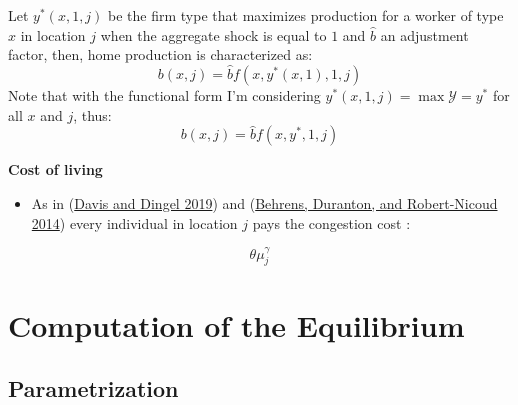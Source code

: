 \documentclass[
  letterpaper,
  DIV=11,
  numbers=noendperiod]{scrreprt}
\providecommand{\tightlist}{%
  \setlength{\itemsep}{0pt}\setlength{\parskip}{0pt}}\usepackage{longtable,booktabs,array}
\begin{document}
Let \(y^*(x,1, j)\) be the firm type that maximizes production for a
worker of type \(x\) in location \(j\) when the aggregate shock is equal
to \(1\) and \(\hat{b}\) an adjustment factor, then, home production is
characterized as:\\
\[
b(x, j) = \hat{b} f(x,y^*(x,1),1, j)\] Note that with the functional
form I'm considering \(y^{*}(x,1,j) = \max{\mathcal{Y}}=y^{*}\) for all
\(x\) and \(j\), thus: \[b(x, j) = \hat{b} f(x,y^*,1, j)\]

\textbf{Cost of living}

\begin{itemize}
\tightlist
\item
  As in (\protect\hyperlink{ref-davisSpatialKnowledgeEconomy2019}{Davis
  and Dingel 2019}) and
  (\protect\hyperlink{ref-behrensProductiveCitiesSorting2014a}{Behrens,
  Duranton, and Robert-Nicoud 2014}) every individual in location \(j\)
  pays the congestion cost :
\end{itemize}

\[\theta\mu_j^{\gamma}\]


\hypertarget{computation-of-the-equilibrium}{%
\chapter{Computation of the
Equilibrium}\label{computation-of-the-equilibrium}}

\hypertarget{parametrization}{%
\section{Parametrization}\label{parametrization}}
\end{document}
